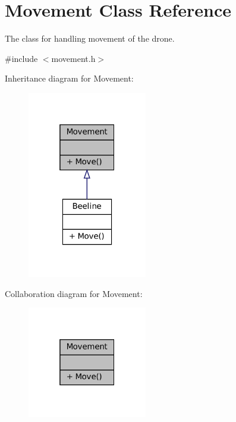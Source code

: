 \hypertarget{classMovement}{}\section{Movement Class Reference}
\label{classMovement}


The class for handling movement of the drone.  




{\ttfamily \#include $<$movement.\+h$>$}



Inheritance diagram for Movement\+:\nopagebreak
\begin{figure}[H]
\begin{center}
\leavevmode
\includegraphics[width=148pt]{classMovement__inherit__graph}
\end{center}
\end{figure}


Collaboration diagram for Movement\+:\nopagebreak
\begin{figure}[H]
\begin{center}
\leavevmode
\includegraphics[width=148pt]{classMovement__coll__graph}
\end{center}
\end{figure}
